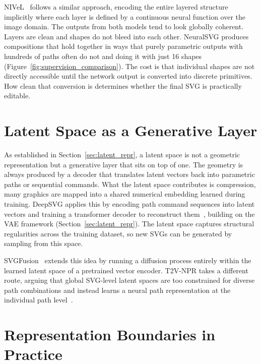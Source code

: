 NIVeL~\cite{thamizharasanNIVeLNeuralImplicit2024} follows a similar approach, 
encoding the entire layered structure implicitly where each layer is defined by a continuous neural function over the image domain.
The outputs from both models tend to look globally coherent. Layers are clean and shapes do not bleed into each other. 
NeuralSVG produces compositions that hold together in ways that purely parametric outputs with hundreds 
of paths often do not and doing it with just 16 shapes (Figure~\ref{fig:supervision_comparison}). The cost is that individual shapes are not directly accessible until the network output is 
converted into discrete primitives. How clean that conversion is determines whether the final SVG is practically editable.

\section{Latent Space as a Generative Layer}
\label{sec:latent}

As established in Section~\ref{sec:latent_repr}, a latent space is not a geometric representation but a generative layer 
that sits on top of one. The geometry is always produced by a decoder that translates latent vectors back into parametric paths 
or sequential commands. What the latent space contributes is compression, many graphics are mapped into a shared numerical embedding 
learned during training. DeepSVG applies this by encoding path command sequences into latent vectors and training a transformer 
decoder to reconstruct them~\cite{carlierDeepSVGHierarchicalGenerative2020}, building on the VAE framework (Section~\ref{sec:latent_repr}). 
The latent space captures structural regularities across the training dataset, so new SVGs can be generated by sampling from this space.

SVGFusion~\cite{xingSVGFusionScalableTexttoSVG2025} extends this idea by running a diffusion process entirely within the learned latent 
space of a pretrained vector encoder. T2V-NPR takes a different route, arguing that global SVG-level 
latent spaces are too constrained for diverse path combinations and instead learns a neural path representation at the individual 
path level~\cite{zhangTexttoVectorGenerationNeural2024}.

\section{Representation Boundaries in Practice}
\label{sec:rep_boundaries}

